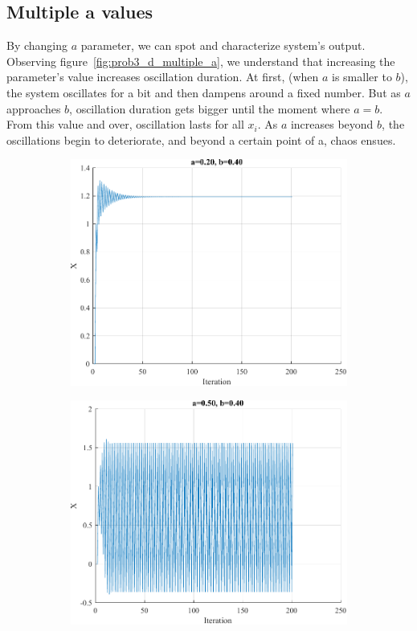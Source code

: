 \subsection{Multiple a values}

By changing $a$ parameter, we can spot and characterize system's output. Observing figure~\ref{fig:prob3_d_multiple_a}, we understand that increasing the parameter's value increases oscillation duration. At first, (when $a$ is smaller to $b$), the system oscillates for a bit and then dampens around a fixed number. But as $a$ approaches $b$, oscillation duration gets bigger until the moment where $a=b$.
From this value and over, oscillation lasts for all $x_i$. As $a$ increases beyond $b$, the oscillations begin to deteriorate, and beyond a certain point of a, chaos ensues.
\begin{figure}[htbp]
	\centering
	\begin{subfigure}{0.3\textwidth}
		\centering
		\includegraphics[width=\textwidth]{../Problem 3/prob3_(d)_a_0.20_b_0.40.pdf}
		\caption{}
	\end{subfigure}
	\begin{subfigure}{0.3\textwidth}
		\centering
		\includegraphics[width=\textwidth]{../Problem 3/prob3_(d)_a_0.50_b_0.40.pdf}

\end{subfigure}
\end{figure}
